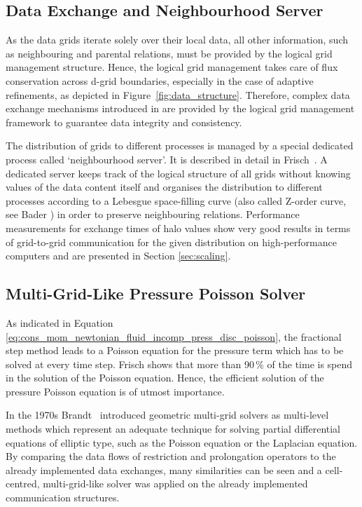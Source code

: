 \documentclass[10pt, conference, compsocconf]{IEEEtran}
\begin{document}
\subsection{Data Exchange and Neighbourhood Server}

As the data grids iterate solely over their local data, all other information, such as neighbouring and parental relations, must be provided by the logical grid management structure. Hence, the logical grid management takes care of flux conservation across d-grid boundaries, especially in the case of adaptive refinements, as depicted in Figure~\ref{fig:data_structure}. Therefore, complex data exchange mechanisms introduced in \cite{Frisch2011Synasc} are provided by the logical grid management framework to guarantee data integrity and consistency.

The distribution of grids to different processes is managed by a special dedicated process called `neighbourhood server'. It is described in detail in Frisch~\cite{Frisch2014Diss}. A dedicated server keeps track of the logical structure of all grids without knowing values of the data content itself and organises the distribution to different processes according to a Lebesgue space-filling curve (also called Z-order curve, see Bader \cite{Bader2013}) in order to preserve neighbouring relations. Performance measurements for exchange times of halo values show very good results in terms of grid-to-grid communication for the given distribution on high-performance computers and are presented in Section \ref{sec:scaling}.

\subsection{Multi-Grid-Like Pressure Poisson Solver}

As indicated in Equation \eqref{eq:cons_mom_newtonian_fluid_incomp_press_disc_poisson}, the fractional step method leads to a Poisson equation for the pressure term which has to be solved at every time step. Frisch \cite{Frisch2014Diss} shows that more than 90\,\% of the time is spend in the solution of the Poisson equation. Hence, the efficient solution of the pressure Poisson equation is of utmost importance.

In the 1970s Brandt~\cite{Brandt1977} introduced geometric multi-grid solvers as multi-level methods which represent an adequate technique for solving partial differential equations of elliptic type, such as the Poisson equation or the Laplacian equation. By comparing the data flows of restriction and prolongation operators to the already implemented data exchanges, many similarities can be seen and a cell-centred, multi-grid-like solver was applied on the already implemented communication structures.
\end{document}
